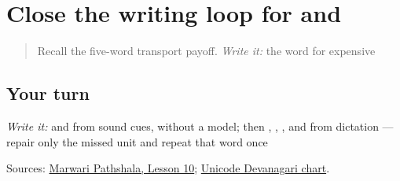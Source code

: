 \section[Practice]{Close the writing loop for  and }

\label{lesson:MW-R17-script-close}



\begin{quote}
Recall the five-word transport payoff. \emph{Write it:} the word for expensive
\end{quote}

\subsection*{Your turn}
\emph{Write it:} \textbf{} and \textbf{} from sound cues, without a model; then \textbf{}, \textbf{}, \textbf{}, and \textbf{} from dictation — repair only the missed unit and repeat that word once

\begin{tcolorbox}[breakable,colback=teal!4,colframe=teal!35!black,title={Before you move on}]
Sources: \href{https://www.marwaripathshala.com/marwari-lesson-10-english}{Marwari Pathshala, Lesson 10}; \href{https://www.unicode.org/charts/PDF/U0900.pdf}{Unicode Devanagari chart}.
\end{tcolorbox}
